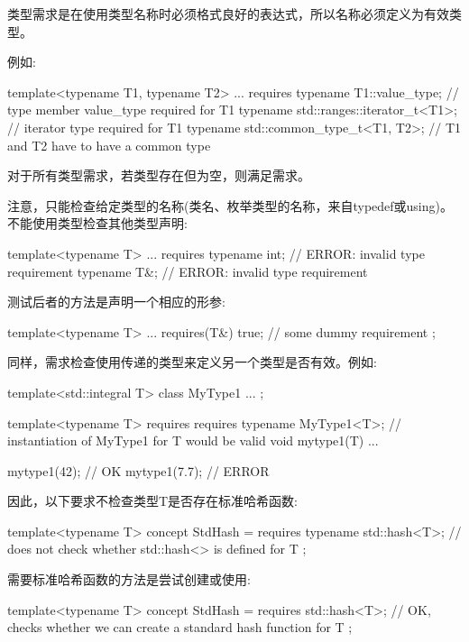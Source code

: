 
类型需求是在使用类型名称时必须格式良好的表达式，所以名称必须定义为有效类型。

例如:

\begin{cpp}
template<typename T1, typename T2>
... requires {
	typename T1::value_type; // type member value_type required for T1
	typename std::ranges::iterator_t<T1>; // iterator type required for T1
	typename std::common_type_t<T1, T2>; // T1 and T2 have to have a common type
}
\end{cpp}

对于所有类型需求，若类型存在但为空，则满足需求。

注意，只能检查给定类型的名称(类名、枚举类型的名称，来自typedef或using)。不能使用类型检查其他类型声明:

\begin{cpp}
template<typename T>
... requires {
	typename int; // ERROR: invalid type requirement
	typename T&; // ERROR: invalid type requirement
}
\end{cpp}

测试后者的方法是声明一个相应的形参:

\begin{cpp}
template<typename T>
... requires(T&) {
	true; // some dummy requirement
};
\end{cpp}

同样，需求检查使用传递的类型来定义另一个类型是否有效。例如:

\begin{cpp}
template<std::integral T>
class MyType1 {
	...
};

template<typename T>
requires requires {
	typename MyType1<T>; // instantiation of MyType1 for T would be valid
}
void mytype1(T) {
	...
}

mytype1(42); // OK
mytype1(7.7); // ERROR
\end{cpp}

因此，以下要求不检查类型T是否存在标准哈希函数:

\begin{cpp}
template<typename T>
concept StdHash = requires {
	typename std::hash<T>; // does not check whether std::hash<> is defined for T
};
\end{cpp}

需要标准哈希函数的方法是尝试创建或使用:

\begin{cpp}
template<typename T>
concept StdHash = requires {
	std::hash<T>{}; // OK, checks whether we can create a standard hash function for T
};
\end{cpp}

